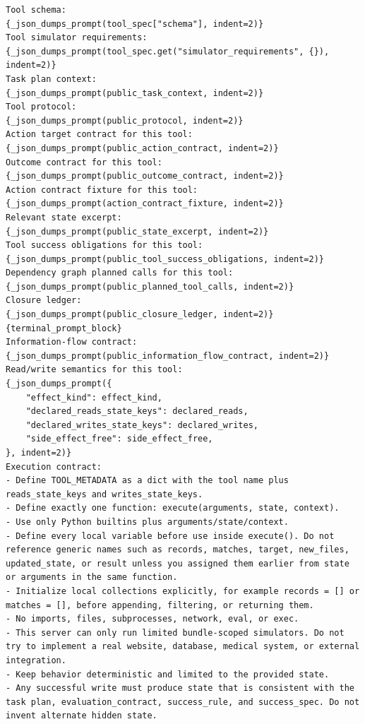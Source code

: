 \begin{tcolorbox}[promptbox,title={Tool-Code Generator Prompt}]
\setlength{\parindent}{0pt}
\begin{Verbatim}[breaklines=true, breakanywhere=true, fontsize=\scriptsize, breaksymbolleft={}]
Tool schema:
{_json_dumps_prompt(tool_spec["schema"], indent=2)}
Tool simulator requirements:
{_json_dumps_prompt(tool_spec.get("simulator_requirements", {}), indent=2)}
Task plan context:
{_json_dumps_prompt(public_task_context, indent=2)}
Tool protocol:
{_json_dumps_prompt(public_protocol, indent=2)}
Action target contract for this tool:
{_json_dumps_prompt(public_action_contract, indent=2)}
Outcome contract for this tool:
{_json_dumps_prompt(public_outcome_contract, indent=2)}
Action contract fixture for this tool:
{_json_dumps_prompt(action_contract_fixture, indent=2)}
Relevant state excerpt:
{_json_dumps_prompt(public_state_excerpt, indent=2)}
Tool success obligations for this tool:
{_json_dumps_prompt(public_tool_success_obligations, indent=2)}
Dependency graph planned calls for this tool:
{_json_dumps_prompt(public_planned_tool_calls, indent=2)}
Closure ledger:
{_json_dumps_prompt(public_closure_ledger, indent=2)}
{terminal_prompt_block}
Information-flow contract:
{_json_dumps_prompt(public_information_flow_contract, indent=2)}
Read/write semantics for this tool:
{_json_dumps_prompt({
    "effect_kind": effect_kind,
    "declared_reads_state_keys": declared_reads,
    "declared_writes_state_keys": declared_writes,
    "side_effect_free": side_effect_free,
}, indent=2)}
Execution contract:
- Define TOOL_METADATA as a dict with the tool name plus reads_state_keys and writes_state_keys.
- Define exactly one function: execute(arguments, state, context).
- Use only Python builtins plus arguments/state/context.
- Define every local variable before use inside execute(). Do not reference generic names such as records, matches, target, new_files, updated_state, or result unless you assigned them earlier from state or arguments in the same function.
- Initialize local collections explicitly, for example records = [] or matches = [], before appending, filtering, or returning them.
- No imports, files, subprocesses, network, eval, or exec.
- This server can only run limited bundle-scoped simulators. Do not try to implement a real website, database, medical system, or external integration.
- Keep behavior deterministic and limited to the provided state.
- Any successful write must produce state that is consistent with the task plan, evaluation_contract, success_rule, and success_spec. Do not invent alternate hidden state.

\end{Verbatim}
\end{tcolorbox}

